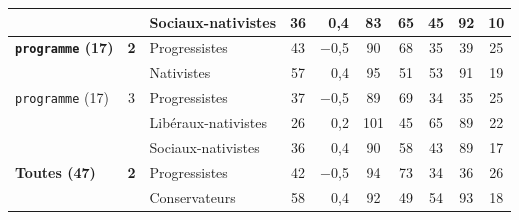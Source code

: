 {\begin{tabular}{lclcrccccc}
 &  & \cellcolor{ced!15}Sociaux-nativistes & \cellcolor{ced!15}36 & \cellcolor{ced!15}0,4\hspace{1em} & \cellcolor{ced!15}83 & \cellcolor{ced!15}65 & \cellcolor{ced!15}45 & \cellcolor{ced!15}92 & \cellcolor{ced!15}10 \\
\midrule
{\bfseries \texttt{programme} (17)} & \textbf{2} & \cellcolor{cleft!15}Progressistes & \cellcolor{cleft!15}43 & \cellcolor{cleft!15}$-$0,5\hspace{1em} & \cellcolor{cleft!15}90 & \cellcolor{cleft!15}68 & \cellcolor{cleft!15}35 & \cellcolor{cleft!15}39 & \cellcolor{cleft!15}25 \\
 &  & \cellcolor{cdroite!15}Nativistes & \cellcolor{cdroite!15}57 & \cellcolor{cdroite!15}0,4\hspace{1em} & \cellcolor{cdroite!15}95 & \cellcolor{cdroite!15}51 & \cellcolor{cdroite!15}53 & \cellcolor{cdroite!15}91 & \cellcolor{cdroite!15}19 \\
\midrule
\texttt{programme} (17) & 3 & \cellcolor{cleft!15}Progressistes & \cellcolor{cleft!15}37 & \cellcolor{cleft!15}$-$0,5\hspace{1em} & \cellcolor{cleft!15}89 & \cellcolor{cleft!15}69 & \cellcolor{cleft!15}34 & \cellcolor{cleft!15}35 & \cellcolor{cleft!15}25 \\
 &  & \cellcolor{ccdroit!15}Libéraux-nativistes & \cellcolor{ccdroit!15}26 & \cellcolor{ccdroit!15}0,2\hspace{1em} & \cellcolor{ccdroit!15}101 & \cellcolor{ccdroit!15}45 & \cellcolor{ccdroit!15}65 & \cellcolor{ccdroit!15}89 & \cellcolor{ccdroit!15}22 \\
 &  & \cellcolor{ced!15}Sociaux-nativistes & \cellcolor{ced!15}36 & \cellcolor{ced!15}0,4\hspace{1em} & \cellcolor{ced!15}90 & \cellcolor{ced!15}58 & \cellcolor{ced!15}43 & \cellcolor{ced!15}89 & \cellcolor{ced!15}17 \\
\midrule
{\bfseries Toutes (47)} & \textbf{2} & \cellcolor{cleft!15}Progressistes & \cellcolor{cleft!15}42 & \cellcolor{cleft!15}$-$0,5\hspace{1em} & \cellcolor{cleft!15}94 & \cellcolor{cleft!15}73 & \cellcolor{cleft!15}34 & \cellcolor{cleft!15}36 & \cellcolor{cleft!15}26 \\
 &  & \cellcolor{cdroite!15}Conservateurs & \cellcolor{cdroite!15}58 & \cellcolor{cdroite!15}0,4\hspace{1em} & \cellcolor{cdroite!15}92 & \cellcolor{cdroite!15}49 & \cellcolor{cdroite!15}54 & \cellcolor{cdroite!15}93 & \cellcolor{cdroite!15}18 \\

\end{tabular}}
